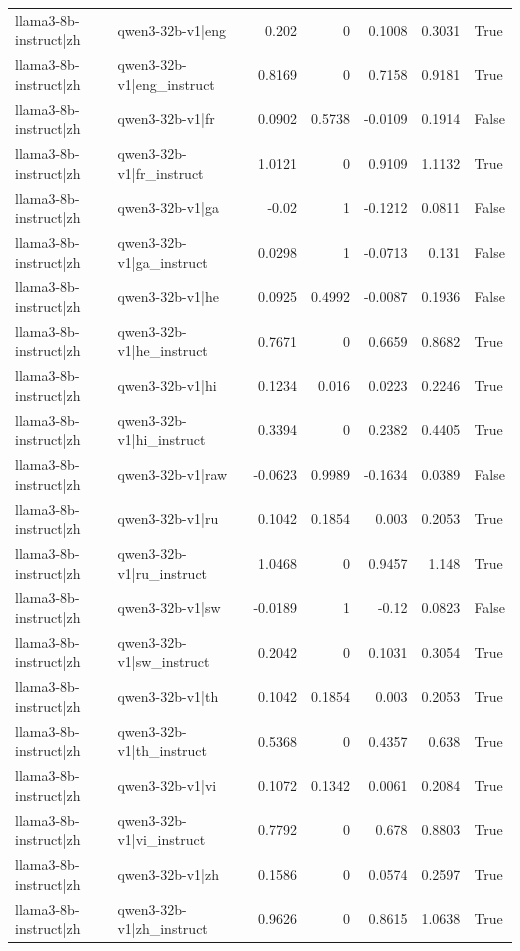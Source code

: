 \begin{table}
\begin{tabular}{l l r r r r l}
llama3-8b-instruct|zh & qwen3-32b-v1|eng & 0.202 & 0 & 0.1008 & 0.3031 & True \\
llama3-8b-instruct|zh & qwen3-32b-v1|eng_instruct & 0.8169 & 0 & 0.7158 & 0.9181 & True \\
llama3-8b-instruct|zh & qwen3-32b-v1|fr & 0.0902 & 0.5738 & -0.0109 & 0.1914 & False \\
llama3-8b-instruct|zh & qwen3-32b-v1|fr_instruct & 1.0121 & 0 & 0.9109 & 1.1132 & True \\
llama3-8b-instruct|zh & qwen3-32b-v1|ga & -0.02 & 1 & -0.1212 & 0.0811 & False \\
llama3-8b-instruct|zh & qwen3-32b-v1|ga_instruct & 0.0298 & 1 & -0.0713 & 0.131 & False \\
llama3-8b-instruct|zh & qwen3-32b-v1|he & 0.0925 & 0.4992 & -0.0087 & 0.1936 & False \\
llama3-8b-instruct|zh & qwen3-32b-v1|he_instruct & 0.7671 & 0 & 0.6659 & 0.8682 & True \\
llama3-8b-instruct|zh & qwen3-32b-v1|hi & 0.1234 & 0.016 & 0.0223 & 0.2246 & True \\
llama3-8b-instruct|zh & qwen3-32b-v1|hi_instruct & 0.3394 & 0 & 0.2382 & 0.4405 & True \\
llama3-8b-instruct|zh & qwen3-32b-v1|raw & -0.0623 & 0.9989 & -0.1634 & 0.0389 & False \\
llama3-8b-instruct|zh & qwen3-32b-v1|ru & 0.1042 & 0.1854 & 0.003 & 0.2053 & True \\
llama3-8b-instruct|zh & qwen3-32b-v1|ru_instruct & 1.0468 & 0 & 0.9457 & 1.148 & True \\
llama3-8b-instruct|zh & qwen3-32b-v1|sw & -0.0189 & 1 & -0.12 & 0.0823 & False \\
llama3-8b-instruct|zh & qwen3-32b-v1|sw_instruct & 0.2042 & 0 & 0.1031 & 0.3054 & True \\
llama3-8b-instruct|zh & qwen3-32b-v1|th & 0.1042 & 0.1854 & 0.003 & 0.2053 & True \\
llama3-8b-instruct|zh & qwen3-32b-v1|th_instruct & 0.5368 & 0 & 0.4357 & 0.638 & True \\
llama3-8b-instruct|zh & qwen3-32b-v1|vi & 0.1072 & 0.1342 & 0.0061 & 0.2084 & True \\
llama3-8b-instruct|zh & qwen3-32b-v1|vi_instruct & 0.7792 & 0 & 0.678 & 0.8803 & True \\
llama3-8b-instruct|zh & qwen3-32b-v1|zh & 0.1586 & 0 & 0.0574 & 0.2597 & True \\
llama3-8b-instruct|zh & qwen3-32b-v1|zh_instruct & 0.9626 & 0 & 0.8615 & 1.0638 & True \\

\end{tabular}
\end{table}
